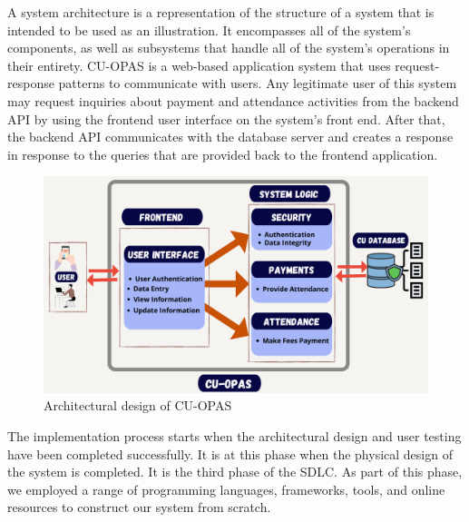 A system architecture is a representation of the structure of a system that is intended to be used as an illustration. It encompasses all of the system's components, as well as subsystems that handle all of the system's operations in their entirety. CU-OPAS is a web-based application system that uses request-response patterns to communicate with users. Any legitimate user of this system may request inquiries about payment and attendance activities from the backend API by using the frontend user interface on the system's front end. After that, the backend API communicates with the database server and creates a response in response to the queries that are provided back to the frontend application.\\

\begin{figure}[H]
    \centering
    \includegraphics[width=1\textwidth]{images/archi}
    \caption{Architectural design of CU-OPAS}
    \label{fig:archi}
\end{figure}

The implementation process starts when the architectural design and user testing have been completed successfully. It is at this phase when the physical design of the system is completed. It is the third phase of the SDLC. As part of this phase, we employed a range of programming languages, frameworks, tools, and online resources to construct our system from scratch.\\

